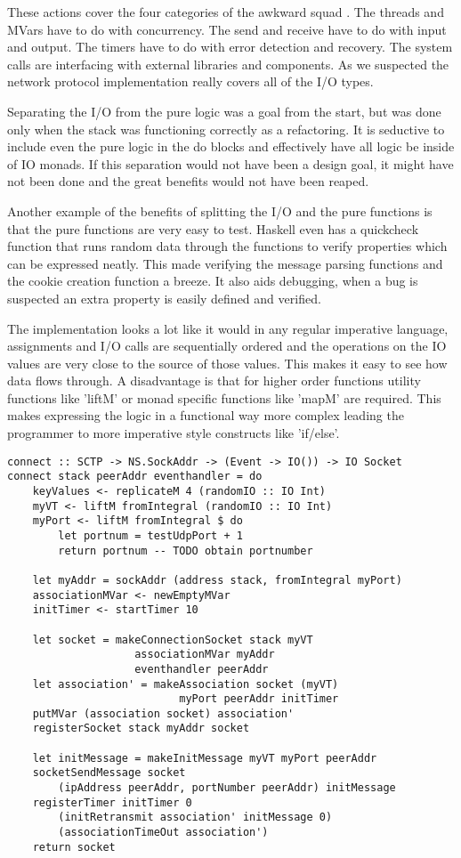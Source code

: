 These actions cover the four categories of the awkward squad \cite{jones_tackling_2009}. The threads and MVars have to do with concurrency. The send and receive have to do with input and output. The timers have to do with error detection and recovery. The system calls are interfacing with external libraries and components. As we suspected the network protocol implementation really covers all of the I/O types.

Separating the I/O from the pure logic was a goal from the start, but was done only when the stack was functioning correctly as a refactoring. It is seductive to include even the pure logic in the do blocks and effectively have all logic be inside of IO monads. If this separation would not have been a design goal, it might have not been done and the great benefits would not have been reaped.

Another example of the benefits of splitting the I/O and the pure functions is that the pure functions are very easy to test. Haskell even has a quickcheck function that runs random data through the functions to verify properties which can be expressed neatly. This made verifying the message parsing functions and the cookie creation function a breeze. It also aids debugging, when a bug is suspected an extra property is easily defined and verified.

The implementation looks a lot like it would in any regular imperative language, assignments and I/O calls are sequentially ordered and the operations on the IO values are very close to the source of those values. This makes it easy to see how data flows through.
A disadvantage is that for higher order functions utility functions like 'liftM' or monad specific functions like 'mapM' are required. This makes expressing the logic in a functional way more complex leading the programmer to more imperative style constructs like 'if/else'.

\begin{lstlisting}[caption={The connect function looks imperative}]
connect :: SCTP -> NS.SockAddr -> (Event -> IO()) -> IO Socket
connect stack peerAddr eventhandler = do
    keyValues <- replicateM 4 (randomIO :: IO Int)
    myVT <- liftM fromIntegral (randomIO :: IO Int)
    myPort <- liftM fromIntegral $ do 
        let portnum = testUdpPort + 1
        return portnum -- TODO obtain portnumber

    let myAddr = sockAddr (address stack, fromIntegral myPort)
    associationMVar <- newEmptyMVar
    initTimer <- startTimer 10

    let socket = makeConnectionSocket stack myVT
                    associationMVar myAddr
                    eventhandler peerAddr
    let association' = makeAssociation socket (myVT) 
                           myPort peerAddr initTimer
    putMVar (association socket) association'
    registerSocket stack myAddr socket

    let initMessage = makeInitMessage myVT myPort peerAddr
    socketSendMessage socket 
        (ipAddress peerAddr, portNumber peerAddr) initMessage
    registerTimer initTimer 0 
        (initRetransmit association' initMessage 0)
        (associationTimeOut association')
    return socket
\end{lstlisting}


